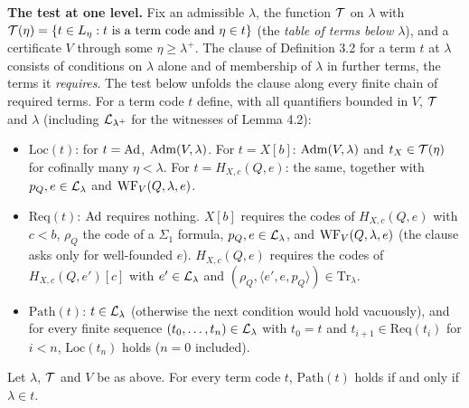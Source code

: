 \documentclass[11pt]{article}
\begin{document}
\textbf{The test at one level.} Fix an admissible $\lambda$, the function $\mathcal{T}$ on $\lambda$ with $\mathcal{T}(\eta) = \{t \in
L_\eta : t \text{ is a term code and } \eta \in t\}$ (the \emph{table of terms below $\lambda$}), and a certificate $V$
through some $\eta \ge \lambda^+$. The clause of Definition 3.2 for a term $t$ at $\lambda$ consists of conditions on
$\lambda$ alone and of membership of $\lambda$ in further terms, the terms it \emph{requires}. The test below unfolds the
clause along every finite chain of required terms. For a term code $t$ define, with all quantifiers bounded in $V$, $\mathcal{T}$ and $\lambda$ (including
$\mathcal{L}_{\lambda^+}$ for the witnesses of Lemma 4.2):
\begin{itemize}
\item $\mathrm{Loc}(t)$: for $t = \mathrm{Ad}$, $\mathrm{Adm}(V,\lambda)$. For $t = X[b]$: $\mathrm{Adm}(V, \lambda)$ and $t_X \in \mathcal{T}(\eta)$ for
  cofinally many $\eta < \lambda$. For $t = H_{X,c}(Q,e)$: the same, together with $p_Q, e \in \mathcal{L}_\lambda$ and
  $\mathrm{WF}_V(Q,\lambda,e)$.
\item $\mathrm{Req}(t)$: $\mathrm{Ad}$ requires nothing. $X[b]$ requires the codes of $H_{X,c}(Q,e)$ with $c < b$, $\rho_Q$ the
  code of a $\Sigma_1$ formula, $p_Q, e \in \mathcal{L}_\lambda$, and $\mathrm{WF}_V(Q, \lambda, e)$ (the clause asks only for
  well-founded $e$). $H_{X,c}(Q,e)$ requires the codes of $H_{X,c}(Q,e')[c]$ with $e' \in \mathcal{L}_\lambda$ and $(\rho_Q,
  \langle e', e, p_Q\rangle) \in \mathrm{Tr}_\lambda$.
\item $\mathrm{Path}(t)$: $t \in \mathcal{L}_\lambda$ (otherwise the next condition would hold vacuously), and for every finite
  sequence $(t_0, \dots, t_n) \in \mathcal{L}_\lambda$ with $t_0 = t$ and $t_{i+1} \in \mathrm{Req}(t_i)$ for $i < n$,
  $\mathrm{Loc}(t_n)$ holds ($n = 0$ included).
\end{itemize}

\begin{statement} Let $\lambda$, $\mathcal{T}$ and $V$ be as above. For every term code $t$, $\mathrm{Path}(t)$
holds if and only if $\lambda \in t$.
\end{statement}
\end{document}
